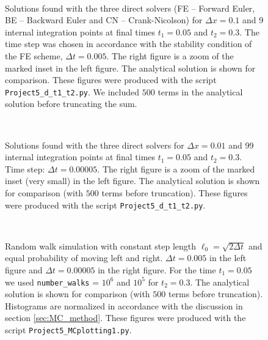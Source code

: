 \documentclass[a4paper, 11pt, notitlepage,english]{article}
\begin{document}
\begin{figure}[h!tb]
 \centering
 \mbox{\quad
 }
 \caption{Solutions found with the three direct solvers (FE – Forward Euler, BE – Backward Euler and CN – Crank-Nicolson) for $\Delta x = 0.1$ and 9 internal integration points at final times $t_1 = 0.05$ and $t_2 = 0.3$. The time step was chosen in accordance with the stability condition of the FE scheme, $\Delta t = 0.005$. The right figure is a zoom of the marked inset in the left figure. The analytical solution is shown for comparison. These figures were produced with the script \texttt{Project5\_d\_t1\_t2.py}. We included $500$ terms in the analytical solution before truncating the sum.}
\label{fig:Three_methods10}
\end{figure}

\begin{figure}[h!tb]
 \centering
 \mbox{\quad
 }
 \caption{Solutions found with the three direct solvers for $\Delta x = 0.01$ and 99 internal integration points at final times $t_1 = 0.05$ and $t_2 = 0.3$. Time step: $\Delta t = 0.00005$. The right figure is a zoom of the marked inset (very small) in the left figure. The analytical solution is shown for comparison (with $500$ terms before truncation). These figures were produced with the script \texttt{Project5\_d\_t1\_t2.py}.}
\label{fig:Three_methods100}
\end{figure}

\begin{figure}[h!tb]
 \centering\mbox{\quad
 }
 \caption{Random walk simulation with constant step length $\ell_0 = \sqrt{2\Delta t}$ and equal probability of moving left and right. $\Delta t = 0.005$ in the left figure and $\Delta t = 0.00005$ in the right figure. For the time $t_1 = 0.05$ we used \texttt{number\_walks} = $10^6$ and $10^5$ for $t_2 = 0.3$. The analytical solution is shown for comparison (with $500$ terms before truncation). Histograms are normalized in accordance with the discussion in section \ref{sec:MC_method}. These figures were produced with the script \texttt{Project5\_MCplotting1.py}.}
\label{fig:MC_uniform}
\end{figure}
\end{document}
